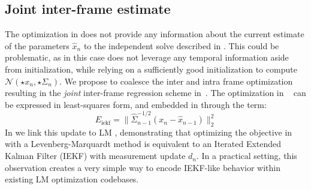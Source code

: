 \subsection{Joint inter-frame estimate}
\label{sec:joint}
The optimization in  does not provide any information about the current estimate of the parameters $\hat{x}_n$ to the independent solve described in . This could be problematic, as in this case  does not leverage any temporal information aside from initialization, while relying on a sufficiently good initialization to compute $\mathcal{N}(\star{x}_n, \star{\Sigma}_n)$. 
%
% 
% 
%
We propose to coalesce the inter and intra frame optimization resulting in the \emph{joint} inter-frame regression scheme in~. 
The optimization in ~ can be expressed in least-squares form, and embedded in  through the term:
% 
\begin{equation}
E_\text{iekf} = \| \hat{\Sigma}^{-1/2}_{n - 1}(x_n - \hat{x}_{n - 1})\|_2^2 
\label{eq:iekflm}   
\end{equation}
%
In  we link this update to LM \cite{Skoglund15}, demonstrating that optimizing the objective in~ with a Levenberg-Marquardt method is equivalent to an Iterated Extended Kalman Filter (IEKF) with measurement update $d_n$.   In a practical setting, this observation creates a very simple way to encode IEKF-like behavior within existing LM optimization codebases.  


